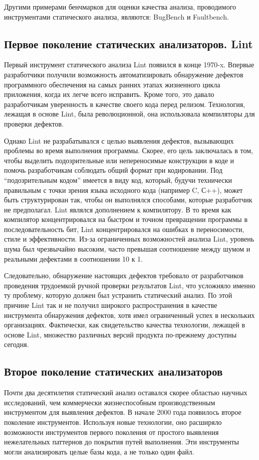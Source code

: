 Другими примерами бенчмарков для оценки качества анализа, проводимого инструментами статического анализа, являются: BugBench\cite{BugBench} и Faultbench\cite{Faultbench}.

\subsection{Первое поколение статических анализаторов. Lint}

Первый инструмент статического анализа Lint\cite{Johnson78lint} появился в конце 1970-x. Впервые разработчики 
получили возможность автоматизировать обнаружение дефектов программного обеспечения на самых 
ранних этапах жизненного цикла приложения, когда их легче всего исправить. Кроме того, это 
давало разработчикам уверенность в качестве своего кода перед релизом. Технология, лежащая в 
основе Lint, была революционной, она использовала компиляторы для проверки дефектов. 

Однако Lint не разрабатывался с целью выявления дефектов, вызывающих проблемы во 
время выполнения программы. Скорее, его цель заключалась в том, чтобы выделить подозрительные 
или непереносимые конструкции в коде и помочь разработчикам соблюдать общий формат при 
кодировании. Под ``подозрительным кодом'' имеется в виду код, который, будучи технически правильным 
с точки зрения языка исходного кода (например C, С++), может быть структурирован так, чтобы он 
выполнялся способами, которые разработчик не предполагал. Lint являлся дополнением к компилятору. В то время как  компилятор концентрировался на быстром и точном превращении программы в последовательность бит, Lint концентрировался на ошибках в переносимости, стиле и эффективности.
Из-за ограниченных возможностей анализа Lint, уровень шума был чрезвычайно высоким, часто превышая соотношение между шумом и реальными дефектами в соотношении 10 к 1.

Следовательно, обнаружение настоящих дефектов требовало от разработчиков проведения трудоемкой 
ручной проверки результатов Lint, что усложняло именно ту проблему, которую должен был 
устранить статический анализ. По этой причине Lint так и не получил широкого распространения в 
качестве инструмента обнаружения дефектов, хотя имел ограниченный успех в нескольких 
организациях. Фактически, как свидетельство качества технологии, лежащей в основе Lint, 
множество различных версий продукта по-прежнему доступны сегодня. %

\subsection{Второе поколение статических анализаторов}
Почти два десятилетия статический анализ оставался скорее областью научных исследований, чем коммерчески 
жизнеспособным производственным инструментом для выявления дефектов. В начале 2000 года
появилось второе поколение инструментов. Используя новые 
технологии, оно расширяло возможности инструментов первого поколения от простого выявления 
нежелательных паттернов до покрытия путей выполнения. Эти инструменты могли анализировать 
целые базы кода, а не только один файл. 

